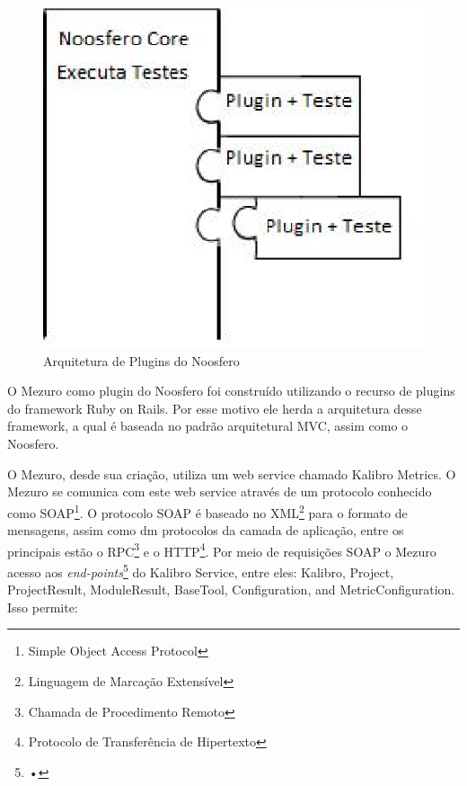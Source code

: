 \graphicspath{{figuras/}}
\begin{figure}[H]
\centering
\includegraphics{plugins}
\caption{Arquitetura de Plugins do Noosfero}
\label{Rotulo}
\end{figure}

O Mezuro como plugin do Noosfero foi construído utilizando o recurso de plugins do framework Ruby on Rails. Por esse motivo ele herda a arquitetura desse framework, a qual é baseada no padrão arquitetural MVC, assim como o Noosfero.

O Mezuro, desde sua criação, utiliza um web service chamado Kalibro Metrics. O Mezuro se comunica com este web service através de um protocolo conhecido como SOAP\footnote{Simple Object Access Protocol}. O protocolo SOAP é baseado no XML\footnote{Linguagem de Marcação Extensível} para o formato de mensagens, assim como dm protocolos da camada de aplicação, entre os principais estão o RPC\footnote{Chamada de Procedimento Remoto} e o HTTP\footnote{Protocolo de Transferência de Hipertexto}. Por meio de requisições SOAP o Mezuro acesso aos \textit{end-points}\footnote{•} do Kalibro Service, entre eles: Kalibro, Project, ProjectResult, ModuleResult, BaseTool, Configuration, and MetricConfiguration. Isso permite:

